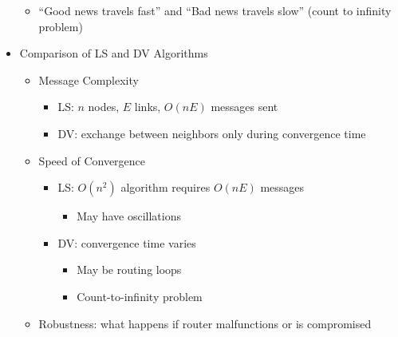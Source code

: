 \begin{itemize}
\begin{itemize}
      \item ``Good news travels fast'' and ``Bad news travels slow'' (count to infinity problem)

    \end{itemize}

  \item Comparison of LS and DV Algorithms

    \begin{itemize}

      \item Message Complexity

        \begin{itemize}

          \item LS: $n$ nodes, $E$ links, $O(nE)$ messages sent

          \item DV: exchange between neighbors only during convergence time

        \end{itemize}

      \item Speed of Convergence

        \begin{itemize}

          \item LS: $O(n^2)$ algorithm requires $O(nE)$ messages

            \begin{itemize}

              \item May have oscillations

            \end{itemize}

          \item DV: convergence time varies

            \begin{itemize}

              \item May be routing loops

              \item Count-to-infinity problem

            \end{itemize}

        \end{itemize}

      \item Robustness: what happens if router malfunctions or is compromised


\end{itemize}
\end{itemize}
